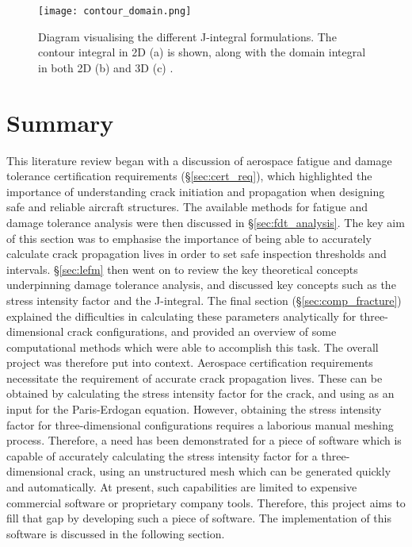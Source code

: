 \begin{figure}[H]
	\centering
	\texttt{[image: contour\_domain.png]}
	\caption{Diagram visualising the different J-integral formulations. The contour integral in 2D (a) is shown, along with the domain integral in both 2D (b) and 3D (c) \cite{systemes_2161_nodate}.}
	\label{fig:integral_domains}
\end{figure}

\section{Summary}

This literature review began with a discussion of aerospace fatigue and damage tolerance certification requirements (\S\ref{sec:cert_req}), which highlighted the importance of understanding crack initiation and propagation when designing safe and reliable aircraft structures. The available methods for fatigue and damage tolerance analysis were then discussed in \S\ref{sec:fdt_analysis}. The key aim of this section was to emphasise the importance of being able to accurately calculate crack propagation lives in order to set safe inspection thresholds and intervals. \S\ref{sec:lefm} then went on to review the key theoretical concepts underpinning damage tolerance analysis, and discussed key concepts such as the stress intensity factor and the J-integral. The final section (\S\ref{sec:comp_fracture}) explained the difficulties in calculating these parameters analytically for three-dimensional crack configurations, and provided an overview of some computational methods which were able to accomplish this task. The overall project was therefore put into context. Aerospace certification requirements necessitate the requirement of accurate crack propagation lives. These can be obtained by calculating the stress intensity factor for the crack, and using as an input for the Paris-Erdogan equation. However, obtaining the stress intensity factor for three-dimensional configurations requires a laborious manual meshing process. Therefore, a need has been demonstrated for a piece of software which is capable of accurately calculating the stress intensity factor for a three-dimensional crack, using an unstructured mesh which can be generated quickly and automatically. At present, such capabilities are limited to expensive commercial software or proprietary company tools. Therefore, this project aims to fill that gap by developing such a piece of software. The implementation of this software is discussed in the following section.
